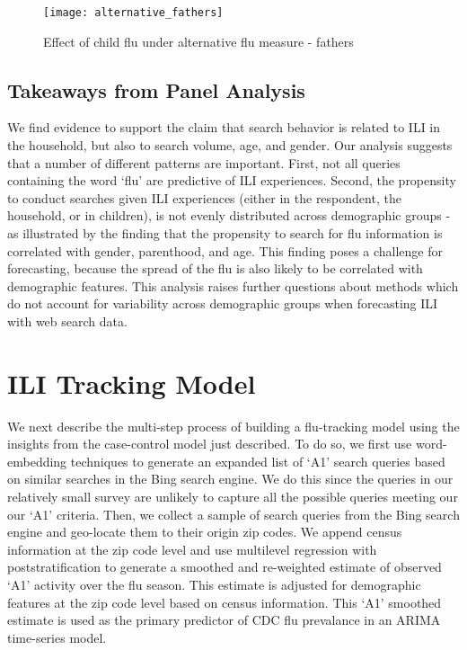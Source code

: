 \documentclass[12pt]{article}
\begin{document}
\begin{figure}[!htbp]
\begin{centering}
   \texttt{[image: alternative\_fathers]}
  \caption{Effect of child flu under alternative flu measure - fathers}
\label{alt_fathers}
\end{centering}
\end{figure}


\subsection{Takeaways from Panel Analysis}

We find evidence to support the claim that search behavior is related to ILI in the household, but also to search volume, age, and gender. Our analysis suggests that a number of different patterns are important. First, not all queries containing the word `flu' are predictive of ILI experiences. Second, the propensity to conduct searches given ILI experiences (either in the respondent, the household, or in children), is not evenly distributed across demographic groups - as illustrated by the finding that the propensity to search for flu information is correlated with gender, parenthood, and age. This finding poses a challenge for forecasting, because the spread of the flu is also likely to be correlated with demographic features. This analysis raises further questions about methods which do not account for variability across demographic groups when forecasting ILI with web search data.

\section*{ILI Tracking Model}

We next describe the multi-step process of building a flu-tracking model using the insights from the case-control model just described. To do so, we first use word-embedding techniques to generate an expanded list of `A1' search queries based on similar searches in the Bing search engine. We do this since the queries in our relatively small survey are unlikely to capture all the possible queries meeting our our `A1' criteria. Then, we collect a sample of search queries from the Bing search engine and geo-locate them to their origin zip codes. We append census information at the zip code level and use multilevel regression with poststratification to generate a smoothed and re-weighted estimate of observed `A1' activity over the flu season. This estimate is adjusted for demographic features at the zip code level based on census information. This `A1' smoothed estimate is used as the primary predictor of CDC flu prevalance in an ARIMA time-series model.
\end{document}
